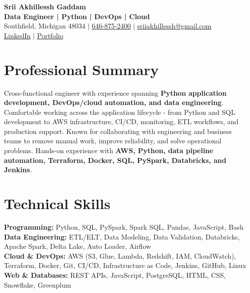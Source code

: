 \documentclass[letterpaper,10pt]{article}
\begin{document}
\fontsize{9.35pt}{10.45pt}\selectfont

\begin{center}
    {\LARGE \textbf{Srii Akhillessh Gaddam}} \\[-1pt]
    \textbf{Data Engineer | Python | DevOps | Cloud} \\[2pt]
    Southfield, Michigan 48034 $|$
    \href{tel:6468752400}{646-875-2400} $|$
    \href{mailto:sriiakhillessh@gmail.com}{sriiakhillessh@gmail.com} \\[1pt]
    \href{https://www.linkedin.com/in/srii-akhiilessh-gaddam-b48668191/}{LinkedIn} $|$
    \href{https://sriiakhillesshg.github.io/portfolio/}{Portfolio}
\end{center}
\vspace{-8pt}

\section{Professional Summary}
\small{Cross-functional engineer with experience spanning \textbf{Python application development, DevOps/cloud automation, and data engineering}. Comfortable working across the application lifecycle - from Python and SQL development to AWS infrastructure, CI/CD, monitoring, ETL workflows, and production support. Known for collaborating with engineering and business teams to remove manual work, improve reliability, and solve operational problems. Hands-on experience with \textbf{AWS, Python, data pipeline automation, Terraform, Docker, SQL, PySpark, Databricks, and Jenkins}.}

\section{Technical Skills}
\small{
\textbf{Programming:} Python, SQL, PySpark, Spark SQL, Pandas, JavaScript, Bash \\
\textbf{Data Engineering:} ETL/ELT, Data Modeling, Data Validation, Databricks, Apache Spark, Delta Lake, Auto Loader, Airflow \\
\textbf{Cloud \& DevOps:} AWS (S3, Glue, Lambda, Redshift, IAM, CloudWatch), Terraform, Docker, Git, CI/CD, Infrastructure as Code, Jenkins, GitHub, Linux \\
\textbf{Web \& Databases:} REST APIs, JavaScript, PostgreSQL, HTML, CSS, Snowflake, Greenplum
}
\end{document}
